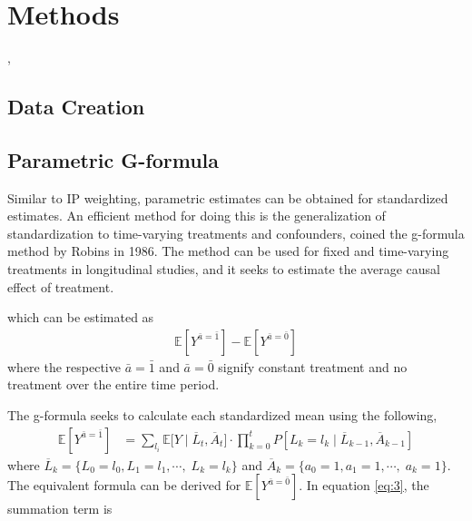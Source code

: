 
\chapter{Methods}

, 


\section{Data Creation} 


\section{Parametric G-formula} 
Similar to IP weighting, parametric estimates can be obtained for standardized estimates.  An efficient method for doing this is the generalization of standardization to time-varying treatments and confounders, coined the g-formula method by Robins in 1986.\cite{robins1986new, wright2015international, hernan_robins_2016}  The method can be used for fixed and time-varying treatments in longitudinal studies, and it seeks to estimate the average causal effect of treatment.  

which can be estimated as 
\begin{align} 
\mathbb{E}[Y^{\bar{a} = \bar{1}}] - \mathbb{E}[Y^{\bar{a} = \bar{0}}] 
\end{align} 
where the respective $\bar{a} = \bar{1}$ and $\bar{a} = \bar{0}$ signify constant treatment and no treatment over the entire time period.  

The g-formula seeks to calculate each standardized mean using the following, 
\begin{align} \label{eq:3} 
\mathbb{E}[Y^{\bar{a}= \bar{1}}] &= \sum_{l_i} \mathbb{E} \big[Y \mid  \overline{L}_{t}, \overline{A}_{t} \big]\cdot \prod_{k=0}^t P[L_k = l_k \mid \overline{L}_{k-1}, \overline{A}_{k-1}]
\end{align}
where $\overline{L}_k = \{L_{0} = l_0, L_{1} = l_1,  \cdots, \; L_{k} = l_k\}$ and $\overline{A}_k = \{a_{0} = 1, a_{1} = 1,  \cdots, \; a_{k} = 1\}$.  The equivalent formula can be derived for $ \mathbb{E}[Y^{\bar{a} = \bar{0}}]$.   In equation \ref{eq:3}, the summation term is 


